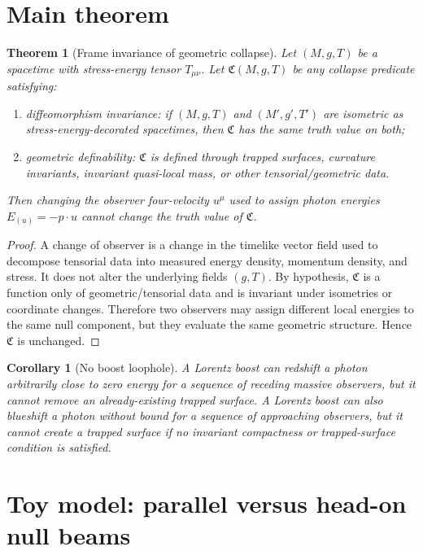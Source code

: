 \documentclass[11pt]{article}
\newtheorem{theorem}{Theorem}
\newtheorem{corollary}{Corollary}
\theoremstyle{remark}
\begin{document}
\section{Main theorem}

\begin{theorem}[Frame invariance of geometric collapse]
Let $(M,g,T)$ be a spacetime with stress-energy tensor $T_{\mu\nu}$. Let $\mathfrak C(M,g,T)$ be any collapse predicate satisfying:
\begin{enumerate}[label=(\alph*)]
\item \emph{diffeomorphism invariance}: if $(M,g,T)$ and $(M',g',T')$ are isometric as stress-energy-decorated spacetimes, then $\mathfrak C$ has the same truth value on both;
\item \emph{geometric definability}: $\mathfrak C$ is defined through trapped surfaces, curvature invariants, invariant quasi-local mass, or other tensorial/geometric data.
\end{enumerate}
Then changing the observer four-velocity $u^\mu$ used to assign photon energies $E_{(u)}=-p\cdot u$ cannot change the truth value of $\mathfrak C$.
\end{theorem}

\begin{proof}
A change of observer is a change in the timelike vector field used to decompose tensorial data into measured energy density, momentum density, and stress. It does not alter the underlying fields $(g,T)$. By hypothesis, $\mathfrak C$ is a function only of geometric/tensorial data and is invariant under isometries or coordinate changes. Therefore two observers may assign different local energies to the same null component, but they evaluate the same geometric structure. Hence $\mathfrak C$ is unchanged.
\end{proof}

\begin{corollary}[No boost loophole]
A Lorentz boost can redshift a photon arbitrarily close to zero energy for a sequence of receding massive observers, but it cannot remove an already-existing trapped surface. A Lorentz boost can also blueshift a photon without bound for a sequence of approaching observers, but it cannot create a trapped surface if no invariant compactness or trapped-surface condition is satisfied.
\end{corollary}

\section{Toy model: parallel versus head-on null beams}
\end{document}
